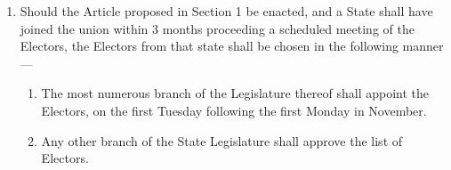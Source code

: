 \documentclass{article}
\begin{document}
    \begin{enumerate}   
        \item Should the Article proposed in Section 1 be enacted, and a State shall have joined the union within 3 months proceeding a scheduled meeting of the Electors, the Electors from that state shall be chosen in the following manner---
        \begin{enumerate}
            \item The most numerous branch of the Legislature thereof shall appoint the Electors, on the first Tuesday following the first Monday in November.
            \item Any other branch of the State Legislature shall approve the list of Electors.
        \end{enumerate}
    \end{enumerate}
\end{document}

